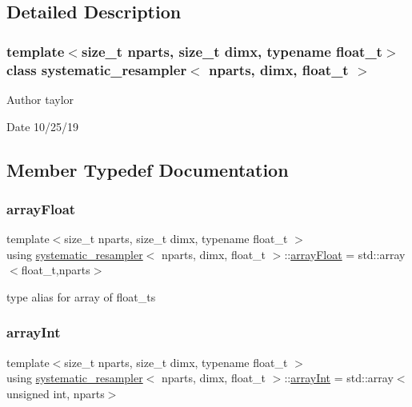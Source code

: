 \subsection{Detailed Description}
\subsubsection*{template$<$size\+\_\+t nparts, size\+\_\+t dimx, typename float\+\_\+t$>$\newline
class systematic\+\_\+resampler$<$ nparts, dimx, float\+\_\+t $>$}

\begin{DoxyAuthor}{Author}
taylor 
\end{DoxyAuthor}
\begin{DoxyDate}{Date}
10/25/19 
\end{DoxyDate}


\subsection{Member Typedef Documentation}
\mbox{\label{classsystematic__resampler_ae3f8e7d5687c068b7fc320fe4ee67871}} 
\subsubsection{\texorpdfstring{array\+Float}{arrayFloat}}
{\footnotesize\ttfamily template$<$size\+\_\+t nparts, size\+\_\+t dimx, typename float\+\_\+t $>$ \\
using \hyperlink{classsystematic__resampler}{systematic\+\_\+resampler}$<$ nparts, dimx, float\+\_\+t $>$\+::\hyperlink{classrbase_a6f76bef853e508cb5b6f546d231b06f5}{array\+Float} =  std\+::array$<$float\+\_\+t,nparts$>$}

type alias for array of float\+\_\+ts \mbox{\label{classsystematic__resampler_afbdf5779938dfee726f87d31040284de}} 
\subsubsection{\texorpdfstring{array\+Int}{arrayInt}}
{\footnotesize\ttfamily template$<$size\+\_\+t nparts, size\+\_\+t dimx, typename float\+\_\+t $>$ \\
using \hyperlink{classsystematic__resampler}{systematic\+\_\+resampler}$<$ nparts, dimx, float\+\_\+t $>$\+::\hyperlink{classsystematic__resampler_afbdf5779938dfee726f87d31040284de}{array\+Int} =  std\+::array$<$unsigned int, nparts$>$}

